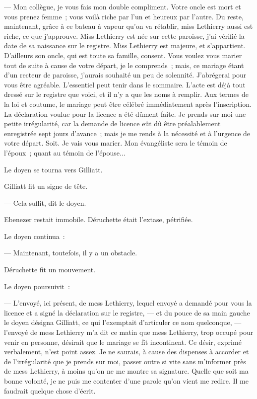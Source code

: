 \documentclass[french,twoside]{book} %
\begin{document}
— Mon collègue, je vous fais mon double compliment. Votre oncle est mort et vous prenez femme ; vous voilà riche par l’un et heureux par l’autre. Du reste, maintenant, grâce à ce bateau à vapeur qu’on va rétablir, miss Lethierry aussi est riche, ce que j’approuve. Miss Lethierry est née sur cette paroisse, j’ai vérifié la date de sa naissance sur le registre. Miss Lethierry est majeure, et s’appartient. D’ailleurs son oncle, qui est toute sa famille, consent. Vous voulez vous marier tout de suite à cause de votre départ, je le comprends ; mais, ce mariage étant d’un recteur de  paroisse, j’aurais souhaité un peu de solennité. J’abrégerai pour vous être agréable. L’essentiel peut tenir dans le sommaire. L’acte est déjà tout dressé sur le registre que voici, et il n’y a que les noms à remplir. Aux termes de la loi et coutume, le mariage peut être célébré immédiatement après l’inscription. La déclaration voulue pour la licence a été dûment faite. Je prends sur moi une petite irrégularité, car la demande de licence eût dû être préalablement enregistrée sept jours d’avance ; mais je me rends à la nécessité et à l’urgence de votre départ. Soit. Je vais vous marier. Mon évangéliste sera le témoin de l’époux ; quant au témoin de l’épouse...\par
Le doyen se tourna vers Gilliatt.\par
Gilliatt fit un signe de tête.\par
— Cela suffit, dit le doyen.\par
Ebenezer restait immobile. Déruchette était l’extase, pétrifiée.\par
Le doyen continua :\par
— Maintenant, toutefois, il y a un obstacle.\par
Déruchette fit un mouvement.\par
Le doyen poursuivit :\par
— L’envoyé, ici présent, de mess Lethierry, lequel envoyé a demandé pour vous la licence et a signé la déclaration sur le registre, — et du pouce de sa main gauche le doyen désigna Gilliatt, ce qui l’exemptait d’articuler ce nom quelconque, — l’envoyé de mess Lethierry m’a dit ce matin que mess Lethierry, trop occupé pour venir en personne, désirait que le mariage se fît incontinent. Ce désir, exprimé verbalement,  n’est point assez. Je ne saurais, à cause des dispenses à accorder et de l’irrégularité que je prends sur moi, passer outre si vite sans m’informer près de mess Lethierry, à moins qu’on ne me montre sa signature. Quelle que soit ma bonne volonté, je ne puis me contenter d’une parole qu’on vient me redire. Il me faudrait quelque chose d’écrit.\par
\end{document}
